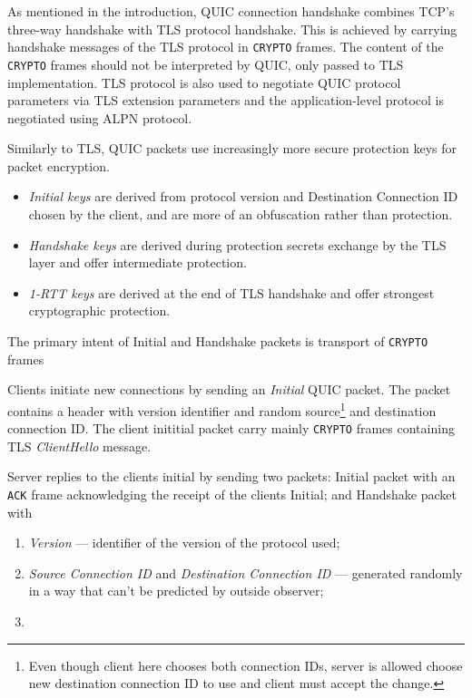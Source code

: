 As mentioned in the introduction, QUIC connection handshake combines TCP's three-way handshake with
TLS protocol handshake. This is achieved by carrying handshake messages of the TLS protocol in
\texttt{CRYPTO} frames. The content of the \texttt{CRYPTO} frames should not be interpreted by QUIC,
only passed to TLS implementation. TLS protocol is also used to negotiate QUIC protocol parameters
via TLS extension parameters and the application-level protocol is negotiated using ALPN
 protocol.

Similarly to TLS, QUIC packets use increasingly more secure
protection keys for packet encryption.

\begin{itemize}
  \item \textit{Initial keys} are derived from protocol version and Destination Connection ID chosen
    by the client, and are more of an obfuscation rather than protection.
  \item \textit{Handshake keys} are derived during protection secrets exchange by the TLS layer and
    offer intermediate protection.
  \item \textit{1-RTT keys} are derived at the end of TLS handshake and offer strongest
    cryptographic protection.
\end{itemize}

The primary intent of Initial and Handshake packets is transport of \texttt{CRYPTO} frames


Clients initiate new connections by sending an \textit{Initial} QUIC packet. The packet contains a
header with version identifier and random  source\footnote{Even though
client here chooses both connection IDs, server is allowed choose new destination connection ID to
use and client must accept the change.} and destination connection ID\@. The client inititial packet
carry mainly \texttt{CRYPTO} frames containing TLS \textit{ClientHello} message.

Server replies to the clients initial by sending two packets: Initial packet with an \texttt{ACK}
frame acknowledging the receipt of the clients Initial; and Handshake packet with

\begin{enumerate}
  \item \textit{Version} --- identifier of the version of the protocol used;
  \item \textit{Source Connection ID} and \textit{Destination Connection ID} --- generated randomly
    in a way that can't be predicted by outside observer;
  \item \textit{}
\end{enumerate}


